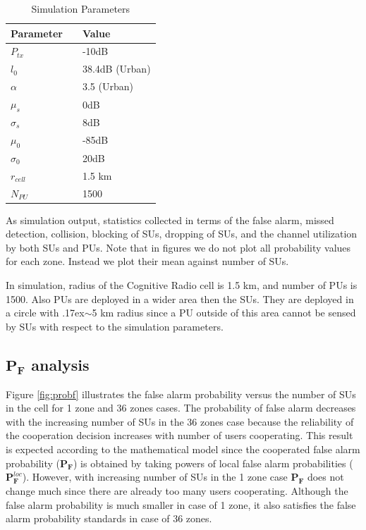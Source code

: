 \documentclass[conference,compsoc]{IEEEtran}
\newcommand{\probf}{\mathbf{P_F}}
\newcommand{\probflocal}{\mathbf{P}_\mathbf{F}^{loc}}
\newcommand{\CR}{Cognitive Radio }
\begin{document}
\begin{table}[!htb]
\renewcommand{\arraystretch}{1.2}
\caption{Simulation Parameters}
\label{tbl:sim_parameters}
\centering
\begin{tabular}{l c l}
  \hline
  Parameter & & Value\\
  \hline
  $P_{tx}$ & & -10dB \\
  $l_0$    & & 38.4dB (Urban) \\
  $\alpha$ & & 3.5 (Urban)\\
  $\mu_s$  & & 0dB\\
  $\sigma_s$ & & 8dB\\
  $\mu_0$  & & -85dB \\
  $\sigma_0$ & & 20dB \\
  $r_{cell}$ & & 1.5 km\\
  $N_{PU}$ & & 1500\\
  \hline
\end{tabular}
\end{table}

As simulation output, statistics collected in terms of the false alarm, missed detection, collision, blocking of SUs, dropping of SUs, and the channel utilization by both SUs and PUs. Note that in figures we do not plot all probability values for each zone. Instead we plot their mean against number of SUs.

In simulation, radius of the \CR cell is 1.5 km, and number of PUs is 1500. Also PUs are deployed in a wider area then the SUs. They are deployed in a circle with {\raise.17ex\hbox{$\scriptstyle\mathtt{\sim}$}}5 km radius since a PU outside of this area cannot be sensed by SUs with respect to the simulation parameters.

\subsection{$\probf$ analysis}
Figure \ref{fig:probf} illustrates the false alarm probability versus the number of SUs in the cell for 1 zone and 36 zones cases. The probability of false alarm decreases with the increasing number of SUs in the 36 zones case because the reliability of the cooperation decision increases with number of users cooperating. This result is expected according to the mathematical model since the cooperated false alarm probability ($\probf$) is obtained by taking powers of local false alarm probabilities ($\probflocal$). However, with increasing number of SUs in the 1 zone case  $\probf$ does not change much since there are already too many users cooperating. Although the false alarm probability is much smaller in case of 1 zone, it also satisfies the false alarm probability standards in case of 36 zones.
\end{document}
